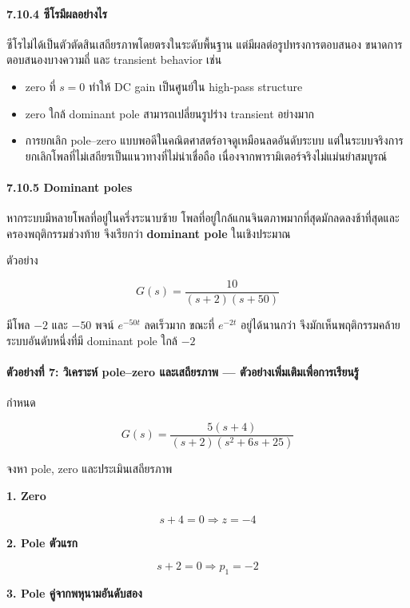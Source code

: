\paragraph{7.10.4 ซีโรมีผลอย่างไร}

ซีโรไม่ได้เป็นตัวตัดสินเสถียรภาพโดยตรงในระดับพื้นฐาน แต่มีผลต่อรูปทรงการตอบสนอง ขนาดการตอบสนองบางความถี่ และ transient behavior เช่น

\begin{itemize}
    \item zero ที่ $s=0$ ทำให้ DC gain เป็นศูนย์ใน high-pass structure
    \item zero ใกล้ dominant pole สามารถเปลี่ยนรูปร่าง transient อย่างมาก
    \item การยกเลิก pole–zero แบบพอดีในคณิตศาสตร์อาจดูเหมือนลดอันดับระบบ แต่ในระบบจริงการยกเลิกโพลที่ไม่เสถียรเป็นแนวทางที่ไม่น่าเชื่อถือ เนื่องจากพารามิเตอร์จริงไม่แม่นยำสมบูรณ์
\end{itemize}

\paragraph{7.10.5 Dominant poles}

หากระบบมีหลายโพลที่อยู่ในครึ่งระนาบซ้าย โพลที่อยู่ใกล้แกนจินตภาพมากที่สุดมักลดลงช้าที่สุดและครองพฤติกรรมช่วงท้าย จึงเรียกว่า \textbf{dominant pole} ในเชิงประมาณ

ตัวอย่าง

\[
G(s)=\frac{10}{(s+2)(s+50)}
\]

มีโพล $-2$ และ $-50$ พจน์ $e^{-50t}$ ลดเร็วมาก ขณะที่ $e^{-2t}$ อยู่ได้นานกว่า จึงมักเห็นพฤติกรรมคล้ายระบบอันดับหนึ่งที่มี dominant pole ใกล้ $-2$

\paragraph{ตัวอย่างที่ 7: วิเคราะห์ pole–zero และเสถียรภาพ — ตัวอย่างเพิ่มเติมเพื่อการเรียนรู้}

กำหนด

\[
G(s)=\frac{5(s+4)}{(s+2)(s^2+6s+25)}
\]

จงหา pole, zero และประเมินเสถียรภาพ

\textbf{1. Zero}

\[
s+4=0\Rightarrow \boxed{z=-4}
\]

\textbf{2. Pole ตัวแรก}

\[
s+2=0\Rightarrow p_1=-2
\]

\textbf{3. Pole คู่จากพหุนามอันดับสอง}

